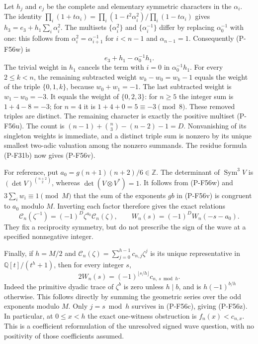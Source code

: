 Let $h_j$ and $e_j$ be the complete and elementary symmetric
characters in the $\alpha_i$.
The identity
$\prod_i(1+t\alpha_i)=
 \prod_i(1-t^2\alpha_i^2)/\prod_i(1-t\alpha_i)$
gives $h_3=e_3+h_1\sum_i\alpha_i^2$.
The multisets $\{\alpha_i^2\}$ and $\{\alpha_i^{-1}\}$
differ by replacing $\alpha_0^{-1}$ with one: this follows
from $\alpha_i^2=\alpha_{i+1}^{-1}$ for $i<n-1$
and $\alpha_{n-1}=1$.
Consequently (P-F56w) is
\[
                       e_3+h_1-\alpha_0^{-1}h_1.
 \tag{P-F56x}
\]
The trivial weight in $h_1$ cancels the term with $i=0$
in $\alpha_0^{-1}h_1$.
For every $2\le k<n$, the remaining subtracted weight
$w_k-w_0=w_k-1$ equals the weight of the triple
$\{0,1,k\}$, because $w_0+w_1=-1$.
The last subtracted weight is $w_1-w_0=-3$.
It equals the weight of $\{0,2,3\}$:
for $n\ge5$ the integer sum is $1+4-8=-3$;
for $n=4$ it is $1+4+0=5\equiv-3\pmod8$.
These removed triples are distinct.
The remaining character is exactly the positive multiset
(P-F56u). The count is
$(n-1)+\binom n3-(n-2)-1=D$.
Nonvanishing of its singleton weights is immediate, and
a distinct triple sum is nonzero by its unique smallest
two-adic valuation among the nonzero summands.
The residue formula (P-F31b) now gives (P-F56v).

For reference, put
$a_0=g(n+1)(n+2)/6\in\mathbb Z$.
The determinant of $\operatorname{Sym}^3 V$ is
$(\det V)^{\binom{n+2}2}$, whereas
$\det(V\otimes V^*)=1$.
It follows from (P-F56w) and $3\sum_i w_i\equiv1\pmod M$
that the sum of the exponents $gb$ in (P-F56v) is congruent
to $a_0$ modulo $M$.
Inverting each factor therefore gives the exact relations
\[
 \mathcal C_n(\zeta^{-1})
       =(-1)^D\zeta^{a_0}\mathcal C_n(\zeta),
 \qquad
 W_n(s)=(-1)^D W_n(-s-a_0).
 \tag{P-F56y}
\]
They fix a reciprocity symmetry, but do not prescribe the sign
of the wave at a specified nonnegative integer.

Finally, if $h=M/2$ and
$\mathcal C_n(\zeta)=\sum_{j=0}^{h-1}c_{n,j}\zeta^j$
is its unique representative in
$\mathbb Q[t]/(t^h+1)$, then for every integer $s$,
\[
             2W_n(s)=
       (-1)^{\lfloor s/h\rfloor}c_{n,\,s\bmod h}.
 \tag{P-F56z}
\]
Indeed the primitive dyadic trace of $\zeta^b$ is zero unless
$h\mid b$, and is $h(-1)^{b/h}$ otherwise. This follows
directly by summing the geometric series over the odd
exponents modulo $M$.
Only $j=s\bmod h$ survives in (P-F56c), giving (P-F56z).
In particular, at $0\le x<h$ the exact one-witness
obstruction is $f_n(x)<c_{n,x}$.
This is a coefficient reformulation of the unresolved signed
wave question, with no positivity of those coefficients assumed.

